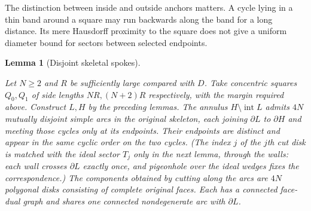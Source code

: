 \documentclass[11pt,a4paper]{article}
\newtheorem{lemma}[definition]{Lemma}
\theoremstyle{remark}
\newcommand{\lean}[1]{}
\newcommand{\uses}[1]{}
\begin{document}
The distinction between inside and outside anchors matters.  A cycle lying
in a thin band around a square may run backwards along the band for a long
distance.  Its mere Hausdorff proximity to the square does not give a
uniform diameter bound for sectors between selected endpoints.

\begin{lemma}[Disjoint skeletal spokes]
\label{lem:annular-spokes}
\lean{Tilings.Geometry.existsAnnularSpokes}
\uses{def:mesh,lem:regular-grouping,lem:outside-grouping}
Let $N\ge2$ and $R$ be sufficiently large compared with $D$.  Take concentric
squares $Q_0,Q_1$ of side lengths $NR,(N+2)R$ respectively, with the margin
required above.  Construct $L,H$ by the preceding lemmas.  The annulus
$H\setminus\operatorname{int}L$ admits $4N$ mutually disjoint simple arcs
in the original skeleton, each joining $\partial L$ to $\partial H$ and
meeting those cycles only at its endpoints.  Their endpoints are distinct
and appear in the same cyclic order on the two cycles.  (The index $j$ of
the $j$th cut disk is matched with the ideal sector $T_j$ only in the next
lemma, through the walls: each wall crosses $\partial L$ exactly once, and
pigeonhole over the ideal wedges fixes the correspondence.)  The components
obtained by cutting along the arcs are $4N$ polygonal disks consisting of
complete original faces.  Each has a connected face-dual graph and shares
one connected nondegenerate arc with $\partial L$.
\end{lemma}
\end{document}
